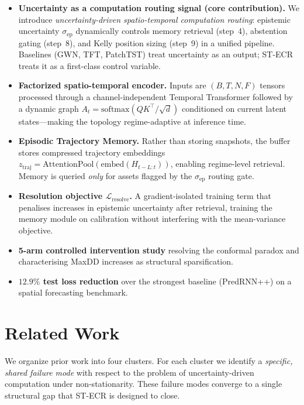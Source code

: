 \documentclass[11pt,a4paper]{article}
\newcommand{\sep}{\sigma_{\mathrm{ep}}}
\newcommand{\ztraj}{z_{\mathrm{traj}}}
\newcommand{\Lres}{\mathcal{L}_{\mathrm{resolve}}}
\begin{document}
\begin{itemize}
\item \textbf{Uncertainty as a computation routing signal (core contribution).}
  We introduce \emph{uncertainty-driven spatio-temporal computation routing}:
  epistemic uncertainty $\sep$ dynamically controls memory retrieval (step~4),
  abstention gating (step~8), and Kelly position sizing (step~9) in a unified
  pipeline.  Baselines (GWN, TFT, PatchTST) treat uncertainty as an output;
  ST-ECR treats it as a first-class control variable.

\item \textbf{Factorized spatio-temporal encoder.}
  Inputs are $(B, T, N, F)$ tensors processed through a channel-independent
  Temporal Transformer followed by a dynamic graph
  $A_t = \mathrm{softmax}(QK^\top/\sqrt{d})$ conditioned on current latent
  states---making the topology regime-adaptive at inference time.

\item \textbf{Episodic Trajectory Memory.}
  Rather than storing snapshots, the buffer stores compressed trajectory
  embeddings $\ztraj = \mathrm{AttentionPool}(\mathrm{embed}(H_{t-L:t}))$,
  enabling regime-level retrieval.  Memory is queried \emph{only} for assets
  flagged by the $\sep$ routing gate.

\item \textbf{Resolution objective $\Lres$.}
  A gradient-isolated training term that penalises increases in epistemic
  uncertainty after retrieval, training the memory module on calibration
  without interfering with the mean-variance objective.

\item \textbf{5-arm controlled intervention study} resolving the conformal
  paradox and characterising MaxDD increases as structural sparsification.

\item \textbf{$12.9\%$ test loss reduction} over the strongest baseline
  (PredRNN++) on a spatial forecasting benchmark.
\end{itemize}

\section{Related Work}
\label{sec:related}

We organize prior work into four clusters.  For each cluster we identify a
\emph{specific, shared failure mode} with respect to the problem of
uncertainty-driven computation under non-stationarity.  These failure modes
converge to a single structural gap that ST-ECR is designed to close.
\end{document}
